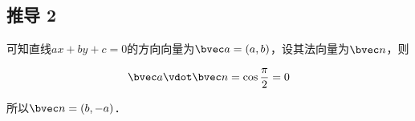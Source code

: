 \subsection{推导 2}


可知直线$ax+by+c=0$的方向向量为$\bvec a=(a,b)$，设其法向量为$\bvec n$，则

\begin{equation}
\bvec a \vdot \bvec n = \cos \frac{\pi}{2} = 0
\end{equation}

所以$\bvec n=(b,-a)$．




